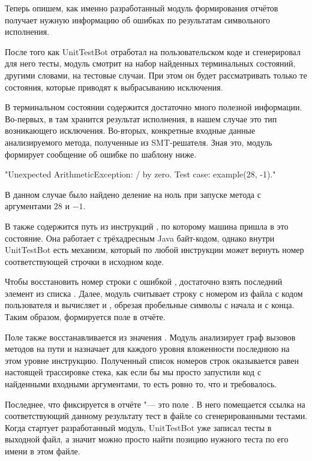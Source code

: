 Теперь опишем, как именно разработанный модуль формирования отчётов получает нужную информацию об ошибках по результатам символьного исполнения.

После того как UnitTestBot отработал на пользовательском коде и сгенерировал для него тесты, модуль смотрит на набор найденных терминальных состояний, другими словами, на тестовые случаи. При этом он будет рассматривать только те состояния, которые приводят к выбрасыванию исключения.

В терминальном состоянии  содержится достаточно много полезной информации. Во-первых, в там хранится результат исполнения, в нашем случае это тип возникающего исключения. Во-вторых, конкретные входные данные анализируемого метода, полученные из SMT-решателя. Зная это, модуль формирует сообщение об ошибке по шаблону ниже.

\begin{zerocode}
"Unexpected ArithmeticException: / by zero.
 Test case: example(28, -1)."
\end{zerocode}

В данном случае было найдено деление на ноль при запуске метода  с аргументами $28$ и $-1$.

В  также содержится путь из инструкций , по которому машина пришла в это состояние. Она работает с трёхадресным Java байт-кодом, однако внутри UnitTestBot есть механизм, который по любой инструкции может вернуть номер соответствующей строчки в исходном коде.

Чтобы восстановить номер строки с ошибкой , достаточно взять последний элемент из списка . Далее, модуль считывает строку с номером  из файла с кодом пользователя и вычисляет  и , обрезая пробельные символы с начала и с конца. Таким образом, формируется поле  в отчёте.

Поле  также восстанавливается из значения . Модуль анализирует граф вызовов методов на пути  и назначает для каждого уровня вложенности последнюю на этом уровне инструкцию. Полученный список номеров строк оказывается равен настоящей трассировке стека, как если бы мы просто запустили код с найденными входными аргументами, то есть ровно то, что и требовалось.

Последнее, что фиксируется в отчёте "--- это поле . В него помещается ссылка на соответствующий данному результату тест в файле со сгенерированными тестами. Когда стартует разработанный модуль, UnitTestBot уже записал тесты в выходной файл, а значит можно просто найти позицию нужного теста по его имени в этом файле.

